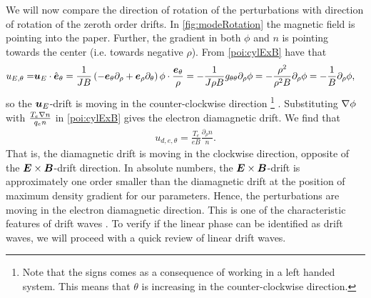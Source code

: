 We will now compare the direction of rotation of the perturbations with direction of rotation of the zeroth order drifts.
In \cref{fig:modeRotation} the magnetic field is pointing into the paper.
Further, the gradient in both $\phi$ and $n$ is pointing towards the center (i.e. towards negative $\rho$).
From \cref{poi:cylExB} have that
%
\begin{align*}
    u_{E,\theta} =& \boldsymbol{u}_{E}\cdot\hat{\boldsymbol{e}}_\theta
    =
     \frac{1}{JB}
           \left(
           - \boldsymbol{e}_\theta\partial_\rho
           + \boldsymbol{e}_\rho\partial_\theta
           \right)
           \phi
    \cdot
    \frac{\boldsymbol{e}_\theta}{\rho}
    =
     - \frac{1}{J\rho B} g_{\theta\theta} \partial_\rho \phi
    =
     - \frac{\rho^2}{\rho^2 B} \partial_\rho \phi
    =
     - \frac{1}{B} \partial_\rho \phi,
\end{align*}
%
so the $\boldsymbol{u}_E$-drift is moving in the counter-clockwise direction%
\footnote{
Note that the signs comes as a consequence of working in a left handed system.
This means that $\theta$ is increasing in the counter-clockwise direction.
}
%
.
Substituting $\nabla\phi$ with $\frac{T_e\nabla n}{q_en}$ in \cref{poi:cylExB} gives the electron diamagnetic drift.
We find that
%
\begin{align*}
    u_{d,e,\theta}= \frac{T_e}{eB} \frac{\partial_\rho n}{n}.
\end{align*}
%
That is, the diamagnetic drift is moving in the clockwise direction, opposite of the $\boldsymbol{E}\times\boldsymbol{B}$-drift direction.
In absolute numbers, the $\boldsymbol{E}\times\boldsymbol{B}$-drift is approximately one order smaller than the diamagnetic drift at the position of maximum density gradient for our parameters.
Hence, the perturbations are moving in the electron diamagnetic direction.
This is one of the characteristic features of drift waves \cite{Jassby1972}.
To verify if the linear phase can be identified as drift waves, we will proceed with a quick review of linear drift waves.

